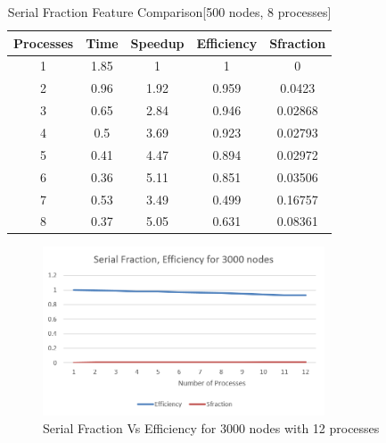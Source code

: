 \begin{table}[h!]
\caption{Serial Fraction Feature Comparison[500 nodes, 8 processes]}
\label{tab:Table1}
\centering
\begin{tabular}{|c|c|c|c|c|}
\hline
Processes & Time & Speedup & Efficiency & Sfraction\\
\hline
\hline
1&	1.85&	1&	1&	0\\
\hline

2&	0.96&	1.92&	0.959&	0.0423\\
\hline

3&	0.65&	2.84&	0.946&	0.02868\\
\hline

4&	0.5&	3.69&	0.923&	0.02793\\
\hline

5&	0.41&	4.47&	0.894&	0.02972\\
\hline

6&	0.36&	5.11&	0.851&	0.03506\\
\hline

7&	0.53	&3.49	&0.499	&0.16757\\
\hline

8	&0.37	&5.05	&0.631	&0.08361\\
\hline

\end{tabular}
\end{table}

\begin{figure}
\begin{center}
  \includegraphics[height=5cm,width=\linewidth]{./image/comp2.png}
\end{center}
  \caption{Serial Fraction Vs Efficiency for 3000 nodes with 12 processes}
  \label{Fig 2:Serial Fraction Comparison}
\end{figure}

